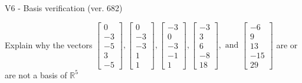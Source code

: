 \begin{exercise}
  \begin{exerciseTitle}V6 - Basis verification (ver. 682)\end{exerciseTitle}
  \begin{exerciseStatement}
    Explain why the vectors \(\left[\begin{array}{r}
0 \\
-3 \\
-5 \\
3 \\
-5
\end{array}\right] , \left[\begin{array}{r}
0 \\
-3 \\
-3 \\
1 \\
1
\end{array}\right] , \left[\begin{array}{r}
-3 \\
0 \\
-3 \\
-1 \\
1
\end{array}\right] , \left[\begin{array}{r}
-3 \\
3 \\
6 \\
-8 \\
18
\end{array}\right] , \text{ and } \left[\begin{array}{r}
-6 \\
9 \\
13 \\
-15 \\
29
\end{array}\right]\) are or are not a basis of \(\mathbb{R}^5\)	



\end{exerciseStatement}
\end{exercise}
